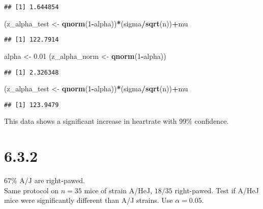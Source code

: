 \documentclass[]{article}
\newenvironment{Shaded}{\begin{snugshade}}{\end{snugshade}}
\newcommand{\KeywordTok}[1]{\textcolor[rgb]{0.13,0.29,0.53}{\textbf{#1}}}
\newcommand{\DecValTok}[1]{\textcolor[rgb]{0.00,0.00,0.81}{#1}}
\newcommand{\FloatTok}[1]{\textcolor[rgb]{0.00,0.00,0.81}{#1}}
\newcommand{\StringTok}[1]{\textcolor[rgb]{0.31,0.60,0.02}{#1}}
\newcommand{\OperatorTok}[1]{\textcolor[rgb]{0.81,0.36,0.00}{\textbf{#1}}}
\newcommand{\NormalTok}[1]{#1}
\begin{document}
\begin{verbatim}
## [1] 1.644854
\end{verbatim}

\begin{Shaded}
\begin{Highlighting}[]
\NormalTok{(z_alpha_test <-}\StringTok{ }\KeywordTok{qnorm}\NormalTok{(}\DecValTok{1}\OperatorTok{-}\NormalTok{alpha))}\OperatorTok{*}\NormalTok{(sigma}\OperatorTok{/}\KeywordTok{sqrt}\NormalTok{(n))}\OperatorTok{+}\NormalTok{mu}
\end{Highlighting}
\end{Shaded}

\begin{verbatim}
## [1] 122.7914
\end{verbatim}

\begin{Shaded}
\begin{Highlighting}[]
\NormalTok{alpha <-}\StringTok{ }\FloatTok{0.01}
\NormalTok{(z_alpha_norm <-}\StringTok{ }\KeywordTok{qnorm}\NormalTok{(}\DecValTok{1}\OperatorTok{-}\NormalTok{alpha))}
\end{Highlighting}
\end{Shaded}

\begin{verbatim}
## [1] 2.326348
\end{verbatim}

\begin{Shaded}
\begin{Highlighting}[]
\NormalTok{(z_alpha_test <-}\StringTok{ }\KeywordTok{qnorm}\NormalTok{(}\DecValTok{1}\OperatorTok{-}\NormalTok{alpha))}\OperatorTok{*}\NormalTok{(sigma}\OperatorTok{/}\KeywordTok{sqrt}\NormalTok{(n))}\OperatorTok{+}\NormalTok{mu}
\end{Highlighting}
\end{Shaded}

\begin{verbatim}
## [1] 123.9479
\end{verbatim}

This data shows a significant increase in heartrate with 99\%
confidence.

\section{6.3.2}\label{section-4}

\(67\)\% A/J are right-pawed.\\
Same protocol on \(n=35\) mice of strain A/HeJ, \(18/35\) right-pawed.
Test if A/HeJ mice were significantly different than A/J strains. Use
\(\alpha = 0.05\).
\end{document}
